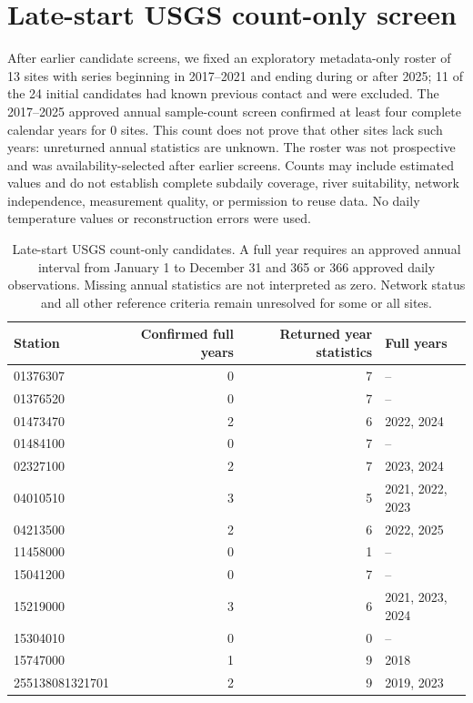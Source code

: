 \section{Late-start USGS count-only screen}
After earlier candidate screens, we fixed an exploratory metadata-only roster of 13 sites with series beginning in 2017--2021 and ending during or after 2025; 11 of the 24 initial candidates had known previous contact and were excluded. The 2017--2025 approved annual sample-count screen confirmed at least four complete calendar years for 0 sites. This count does not prove that other sites lack such years: unreturned annual statistics are unknown. The roster was not prospective and was availability-selected after earlier screens. Counts may include estimated values and do not establish complete subdaily coverage, river suitability, network independence, measurement quality, or permission to reuse data. No daily temperature values or reconstruction errors were used.
\begin{table}[p]\centering\small
\caption{Late-start USGS count-only candidates. A full year requires an approved annual interval from January 1 to December 31 and 365 or 366 approved daily observations. Missing annual statistics are not interpreted as zero. Network status and all other reference criteria remain unresolved for some or all sites.}\label{tab:usgs-late-start}
\begin{tabular}{lrrl}\toprule
Station & Confirmed full years & Returned year statistics & Full years\\\midrule
01376307 & 0 & 7 & --\\
01376520 & 0 & 7 & --\\
01473470 & 2 & 6 & 2022, 2024\\
01484100 & 0 & 7 & --\\
02327100 & 2 & 7 & 2023, 2024\\
04010510 & 3 & 5 & 2021, 2022, 2023\\
04213500 & 2 & 6 & 2022, 2025\\
11458000 & 0 & 1 & --\\
15041200 & 0 & 7 & --\\
15219000 & 3 & 6 & 2021, 2023, 2024\\
15304010 & 0 & 0 & --\\
15747000 & 1 & 9 & 2018\\
255138081321701 & 2 & 9 & 2019, 2023\\
\bottomrule\end{tabular}
\end{table}
